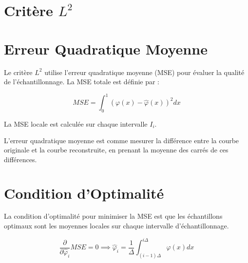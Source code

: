\documentclass[12pt]{article}
\begin{document}
\newpage

\section{Critère \(L^2\)}

\sub\section{Erreur Quadratique Moyenne}

Le critère \(L^2\) utilise l'erreur quadratique moyenne (MSE) pour évaluer la qualité de l'échantillonnage. La MSE totale est définie par :

\begin{equation}
MSE = \int_0^1 (\varphi(x) - \hat{\varphi}(x))^2 dx
\end{equation}

La MSE locale est calculée sur chaque intervalle \(I_i\).

\begin{tcolorbox}[title={Vulgarisation simple}]
L'erreur quadratique moyenne est comme mesurer la différence entre la courbe originale et la courbe reconstruite, en prenant la moyenne des carrés de ces différences.
\end{tcolorbox}


\sub\section{Condition d'Optimalité}

La condition d'optimalité pour minimiser la MSE est que les échantillons optimaux sont les moyennes locales sur chaque intervalle d'échantillonnage.

\begin{equation}
\frac{\partial}{\partial \hat{\varphi}_i} MSE = 0 \implies \hat{\varphi}_i = \frac{1}{\Delta} \int_{(i-1)\Delta}^{i\Delta} \varphi(x) dx
\end{equation}

\end{document}
